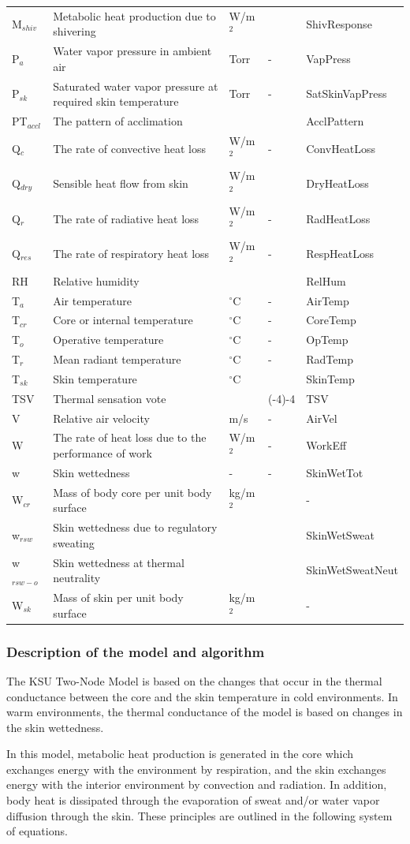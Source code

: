\begin{longtable}[c]{p{1.2in}p{2.0in}p{0.8in}p{0.8in}p{1.2in}}
M\(_{shiv}\) & Metabolic heat production due to shivering & W/m\(^{2}\) & ~ & ShivResponse \tabularnewline
P\(_{a}\) & Water vapor pressure in ambient air & Torr & - & VapPress \tabularnewline
P\(_{sk}\) & Saturated water vapor pressure at required skin temperature & Torr & - & SatSkinVapPress \tabularnewline
PT\(_{accl}\) & The pattern of acclimation & ~ & ~ & AcclPattern \tabularnewline
Q\(_{c}\) & The rate of convective heat loss & W/m\(^{2}\) & - & ConvHeatLoss \tabularnewline
Q\(_{dry}\) & Sensible heat flow from skin & W/m\(^{2}\) & ~ & DryHeatLoss \tabularnewline
Q\(_{r}\) & The rate of radiative heat loss & W/m\(^{2}\) & - & RadHeatLoss \tabularnewline
Q\(_{res}\) & The rate of respiratory heat loss & W/m\(^{2}\) & - & RespHeatLoss \tabularnewline
RH & Relative humidity & ~ & ~ & RelHum \tabularnewline
T\(_{a}\) & Air temperature & \(^{\circ}\)C & - & AirTemp \tabularnewline
T\(_{cr}\) & Core or internal temperature & \(^{\circ}\)C & - & CoreTemp \tabularnewline
T\(_{o}\) & Operative temperature & \(^{\circ}\)C & - & OpTemp \tabularnewline
T\(_{r}\) & Mean radiant temperature & \(^{\circ}\)C & - & RadTemp \tabularnewline
T\(_{sk}\) & Skin temperature & \(^{\circ}\)C & ~ & SkinTemp \tabularnewline
TSV & Thermal sensation vote & ~ & (-4)-4 & TSV \tabularnewline
V & Relative air velocity & m/s & - & AirVel \tabularnewline
W & The rate of heat loss due to the performance of work & W/m\(^{2}\) & - & WorkEff \tabularnewline
w & Skin wettedness & - & - & SkinWetTot \tabularnewline
W\(_{cr}\) & Mass of body core per unit body surface & kg/m\(^{2}\) & ~ & - \tabularnewline
w\(_{rsw}\) & Skin wettedness due to regulatory sweating & ~ & ~ & SkinWetSweat \tabularnewline
w\(_{rsw-o}\) & Skin wettedness at thermal neutrality & ~ & ~ & SkinWetSweatNeut \tabularnewline
W\(_{sk}\) & Mass of skin per unit body surface & kg/m\(^{2}\) & ~ & - \tabularnewline
\bottomrule
\end{longtable}

\subsubsection{Description of the model and algorithm}\label{description-of-the-model-and-algorithm-2}

The KSU Two-Node Model is based on the changes that occur in the thermal conductance between the core and the skin temperature in cold environments. In warm environments, the thermal conductance of the model is based on changes in the skin wettedness.

In this model, metabolic heat production is generated in the core which exchanges energy with the environment by respiration, and the skin exchanges energy with the interior environment by convection and radiation. In addition, body heat is dissipated through the evaporation of sweat and/or water vapor diffusion through the skin. These principles are outlined in the following system of equations.

